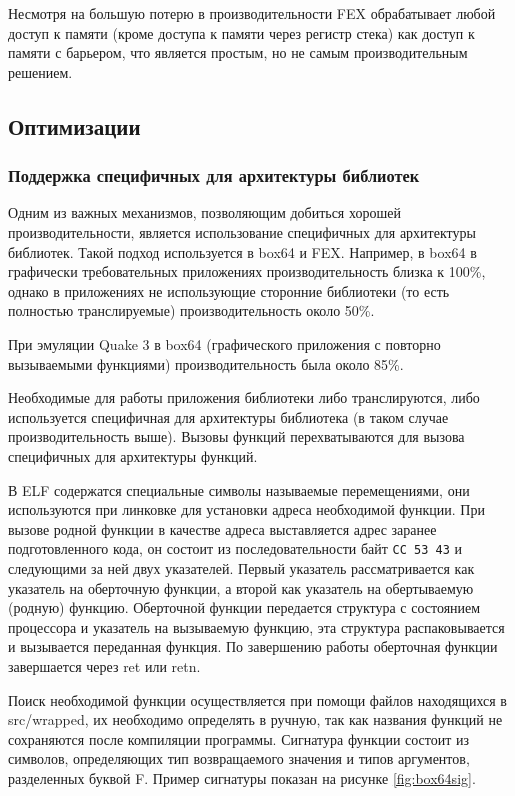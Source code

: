 Несмотря на большую потерю в производительности FEX обрабатывает любой доступ к памяти (кроме доступа к памяти через регистр стека) как доступ к памяти с барьером, что является простым, но не самым производительным решением.
	
\subsection{Оптимизации}

\subsubsection{Поддержка специфичных для архитектуры библиотек}

Одним из важных механизмов, позволяющим добиться хорошей производительности, является использование специфичных для архитектуры библиотек. Такой подход используется в box64 и FEX. Например, в box64 в графически требовательных приложениях производительность близка к 100\%, однако в приложениях не использующие сторонние библиотеки (то есть полностью транслируемые) производительность около 50\%.

При эмуляции Quake 3 в box64 (графического приложения с повторно вызываемыми функциями) производительность была около 85\%.

Необходимые для работы приложения библиотеки либо транслируются, либо используется специфичная для архитектуры библиотека (в таком случае производительность выше). Вызовы функций перехватываются для вызова специфичных для архитектуры функций. 

В ELF содержатся специальные символы называемые перемещениями, они используются при линковке для установки адреса необходимой функции. При вызове родной функции в качестве адреса выставляется адрес заранее подготовленного кода, он состоит из последовательности байт \texttt{CC 53 43} и следующими за ней двух указателей. Первый указатель рассматривается как указатель на оберточную функции, а второй как указатель на обертываемую (родную) функцию. Оберточной функции передается структура с состоянием процессора и указатель на вызываемую функцию, эта структура распаковывается и вызывается переданная функция. По завершению работы оберточная функции завершается через ret или retn.

Поиск необходимой функции осуществляется при помощи файлов находящихся в src/wrapped, их необходимо определять в ручную, так как названия функций не сохраняются после компиляции программы. Сигнатура функции состоит из символов, определяющих тип возвращаемого значения и типов аргументов, разделенных буквой F. Пример сигнатуры показан на рисунке \ref{fig:box64sig}.

